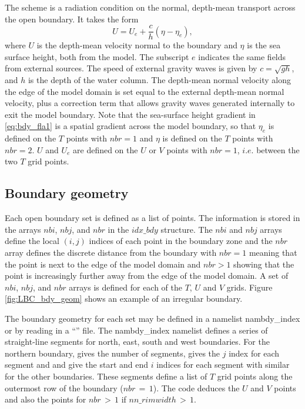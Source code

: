 \documentclass[../tex_main/NEMO_manual]{subfiles}
\begin{document}
The \citet{Flather_JPO94} scheme is a radiation condition on the normal,
depth-mean transport across the open boundary.
It takes the form
\begin{equation}  \label{eq:bdy_fla1}
U = U_{e} + \frac{c}{h}\left(\eta - \eta_{e}\right),
\end{equation}
where $U$ is the depth-mean velocity normal to the boundary and $\eta$ is the sea surface height,
both from the model.
The subscript $e$ indicates the same fields from external sources.
The speed of external gravity waves is given by $c = \sqrt{gh}$, and $h$ is the depth of the water column.
The depth-mean normal velocity along the edge of the model domain is set equal to
the external depth-mean normal velocity,
plus a correction term that allows gravity waves generated internally to exit the model boundary.
Note that the sea-surface height gradient in \autoref{eq:bdy_fla1} is a spatial gradient across the model boundary,
so that $\eta_{e}$ is defined on the $T$ points with $nbr=1$ and $\eta$ is defined on the $T$ points with $nbr=2$.
$U$ and $U_{e}$ are defined on the $U$ or $V$ points with $nbr=1$, $i.e.$ between the two $T$ grid points.

\subsection{Boundary geometry}
\label{subsec:BDY_geometry}

Each open boundary set is defined as a list of points.
The information is stored in the arrays $nbi$, $nbj$, and $nbr$ in the $idx\_bdy$ structure.
The $nbi$ and $nbj$ arrays define the local $(i,j)$ indices of each point in the boundary zone and
the $nbr$ array defines the discrete distance from the boundary with $nbr=1$ meaning that
the point is next to the edge of the model domain and $nbr>1$ showing that
the point is increasingly further away from the edge of the model domain.
A set of $nbi$, $nbj$, and $nbr$ arrays is defined for each of the $T$, $U$ and $V$ grids.
Figure \autoref{fig:LBC_bdy_geom} shows an example of an irregular boundary. 

The boundary geometry for each set may be defined in a namelist nambdy\_index or
by reading in a ``'' file.
The nambdy\_index namelist defines a series of straight-line segments for north, east, south and west boundaries.
For the northern boundary,  gives the number of segments,
 gives the $j$ index for each segment and  and
 give the start and end $i$ indices for each segment with similar for the other boundaries.
These segments define a list of $T$ grid points along the outermost row of the boundary ($nbr\,=\, 1$).
The code deduces the $U$ and $V$ points and also the points for $nbr\,>\, 1$ if $nn\_rimwidth\,>\,1$.
\end{document}

